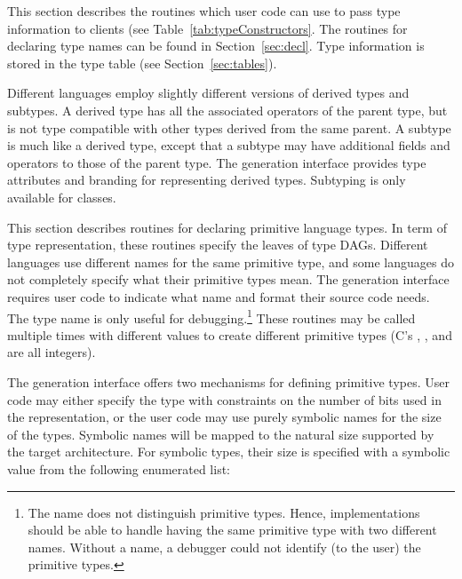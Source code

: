 \label{sec:type}

This section describes the routines which user code can use to pass
type information to clients (see Table~\ref{tab:typeConstructors}.
The routines for declaring type names can be found in
Section~\ref{sec:decl}.  Type information is stored in the type table
(see Section~\ref{sec:tables}).



Different languages employ slightly different versions of derived
types and subtypes.  A derived type has all the associated operators
of the parent type, but is not type compatible with other types
derived from the same parent.  A subtype is much like a derived type,
except that a subtype may have additional fields and operators to
those of the parent type.  The generation interface provides type
attributes and branding for representing derived types.  Subtyping is
only available for classes.


This section describes routines for declaring primitive language
types.  In term of type representation, these routines specify the
leaves of type DAGs.  Different languages use different names for the
same primitive type, and some languages do not completely specify what
their primitive types mean.  The generation interface requires user
code to indicate what name and format their source code needs.  The
type name is only useful for debugging.\footnote{The name does not
distinguish primitive types.  Hence, implementations should be able to
handle having the same primitive type with two different names.
Without a name, a debugger could not identify (to the user) the
primitive types.}  These routines may be called multiple times with
different values to create different primitive types (\eg C's
, , and  are all integers).  

The generation interface offers two mechanisms for defining primitive
types.  User code may either specify the type with constraints on the
number of bits used in the representation, or the user code may use
purely symbolic names for the size of the types.  Symbolic names will
be mapped to the natural size supported by the target architecture.
For symbolic types, their size is specified with a symbolic value from
the following enumerated list:

